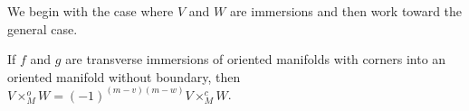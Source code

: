 \begin{comment}
	is already contained in the construction of the co-oriented fiber product, where $V\times^c_MW$ can be considered to be contained in $V \times W \times \R^N$.
	Explicitly we constructed $P = (g \times \id_{\R^N})^{-1}(e(V))$, but as $e$ is an embedding, the $V$ factor of points in $P$ is implicitly determined by $(w,z) \in P \subset W \times \R^N$ as $e^{-1}((g(w),z))$.
	So $P = (g \times \id_{\R^N})^{-1}(e(V))$ is canonically identified with $\{(v,w,z) \in V \times W \times \R^N \mid e(v) = (g(w),z)\}$.
	And as $e$ is part of a Quillen co-orientation, by projecting $M \times \R^N$ to $M$, we have of course $g(w) = f(v)$, so there is a canonical map $\{(v,w,z) \in V \times W \times \R^N \mid e(v) \to \{(v,w) \in V \times W \mid f(v) = g(w)\}$ given by projection to the first two factors.
	This is a diffeomorphism, whose inverse takes $(v,w)$ to $(v,w,z)$ such that $e(v) = (g(w),z)$.

	\red{Put some of this as a remark in the section where pullback of co-orientation is defined.}
\end{comment}

\medskip

We begin with the case where $V$ and $W$ are immersions and then work toward the general case.

\begin{lemma}\label{L: compare cup and intersection for immersions}
	If $f$ and $g$ are transverse immersions of oriented manifolds with corners into an oriented manifold without boundary, then $V \times_M ^oW = (-1)^{(m-v)(m-w)} V \times_M ^cW$.
\end{lemma}

